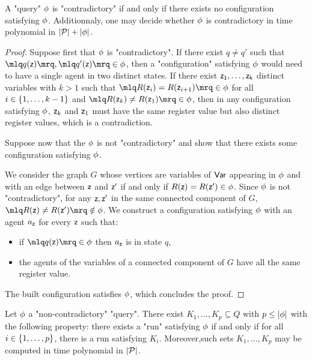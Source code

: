\begin{proposition}
A "query" $\phi$ is "contradictory" if and only if there exists no configuration satisfying $\phi$. Additionnaly, one may decide whether $\phi$ is contradictory in time polynomial in $|\mathcal{P}| + |\phi|$. 
\end{proposition}
\begin{proof}
Suppose first that $\phi$ is "contradictory". If there exist $q \ne q'$ such that
 $\quotemarks{q(\varz)}, \quotemarks{q'(\varz)} \in \query$,  then a "configuration" satisfying $\phi$ would need to have a single agent in two distinct states. If there exist $\mathsf{z_1}, \ldots, \mathsf{z_k}$ distinct variables with $k>1$ such that $\quotemarks{R(\varz_{i}) = R(\varz_{i+1})} \in \query$ for all $i \in \{1,\ldots,k-1\}$ and $\quotemarks{R(\varz_k) \neq R(\varz_1)} \in \query$, then in any configuration satisfying $\phi$, $\mathsf{z}_k$ and $\mathsf{z}_1$ must have the same register value but also distinct register values, which is a contradiction. 

Suppose now that the $\phi$ is not "contradictory" and show that there exists some configuration satisfying $\phi$.

We consider the graph $G$ whose vertices are variables of $\mathsf{Var}$ appearing in $\phi$ and with an edge between $\mathsf{z}$ and $\mathsf{z}'$ if and only if $R(\mathsf{z}) = R(\mathsf{z}') \in \phi$. Since $\phi$ is not "contradictory", for any $\mathsf{z}, \mathsf{z}'$ in the same connected component of $G$, $\quotemarks{R(\varz) \ne R(\varz')} \notin \query$. We construct a configuration satisfying $\phi$ with an agent $a_{\mathsf{z}}$ for every $\mathsf{z}$ such that:
\begin{itemize}
\item if $\quotemarks{q(\varz)} \in \query$ then $a_{\mathsf{z}}$ is in state $q$,
\item the agents of the variables of a connected component of $G$ have all the same register value.  
\end{itemize}
The built configuration satisfies $\phi$, which concludes the proof. 
\end{proof}

\begin{lemma}
\label{lem:query-decomposition}
Let $\phi$ a  "non-contradictory" "query". There exist $K_1, \ldots, K_p \subseteq Q$ with $p \leq |\phi|$ with the following property: there exists a "run" satisfying $\phi$ if and only if for all $i \in \{1,\ldots, p\}$, there is a run satisfying $K_i$. Moreover,such sets $K_1, \dots, K_p$ may be computed in time polynomial in $|\mathcal{P}|$. 
\end{lemma}

